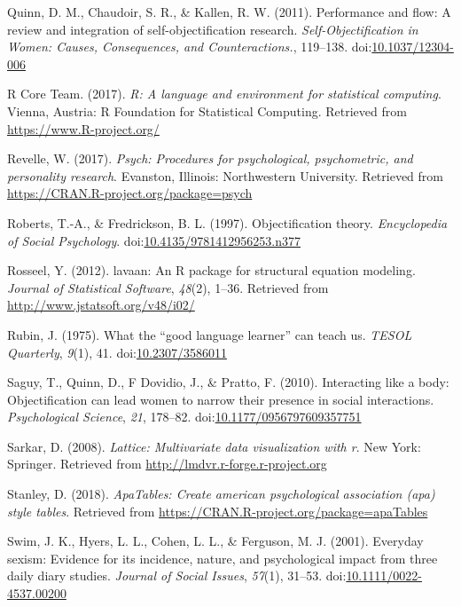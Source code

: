 \documentclass[man]{apa6}
\begin{document}
\hypertarget{ref-quinnetal}{}
Quinn, D. M., Chaudoir, S. R., \& Kallen, R. W. (2011). Performance and
flow: A review and integration of self-objectification research.
\emph{Self-Objectification in Women: Causes, Consequences, and
Counteractions.}, 119--138.
doi:\href{https://doi.org/10.1037/12304-006}{10.1037/12304-006}

\hypertarget{ref-R-base}{}
R Core Team. (2017). \emph{R: A language and environment for statistical
computing}. Vienna, Austria: R Foundation for Statistical Computing.
Retrieved from \url{https://www.R-project.org/}

\hypertarget{ref-R-psych}{}
Revelle, W. (2017). \emph{Psych: Procedures for psychological,
psychometric, and personality research}. Evanston, Illinois:
Northwestern University. Retrieved from
\url{https://CRAN.R-project.org/package=psych}

\hypertarget{ref-robertsfredrickson}{}
Roberts, T.-A., \& Fredrickson, B. L. (1997). Objectification theory.
\emph{Encyclopedia of Social Psychology}.
doi:\href{https://doi.org/10.4135/9781412956253.n377}{10.4135/9781412956253.n377}

\hypertarget{ref-R-lavaan}{}
Rosseel, Y. (2012). lavaan: An R package for structural equation
modeling. \emph{Journal of Statistical Software}, \emph{48}(2), 1--36.
Retrieved from \url{http://www.jstatsoft.org/v48/i02/}

\hypertarget{ref-rubin1975}{}
Rubin, J. (1975). What the ``good language learner'' can teach us.
\emph{TESOL Quarterly}, \emph{9}(1), 41.
doi:\href{https://doi.org/10.2307/3586011}{10.2307/3586011}

\hypertarget{ref-saguyetal2010}{}
Saguy, T., Quinn, D., F Dovidio, J., \& Pratto, F. (2010). Interacting
like a body: Objectification can lead women to narrow their presence in
social interactions. \emph{Psychological Science}, \emph{21}, 178--82.
doi:\href{https://doi.org/10.1177/0956797609357751}{10.1177/0956797609357751}

\hypertarget{ref-R-lattice}{}
Sarkar, D. (2008). \emph{Lattice: Multivariate data visualization with
r}. New York: Springer. Retrieved from
\url{http://lmdvr.r-forge.r-project.org}

\hypertarget{ref-R-apaTables}{}
Stanley, D. (2018). \emph{ApaTables: Create american psychological
association (apa) style tables}. Retrieved from
\url{https://CRAN.R-project.org/package=apaTables}

\hypertarget{ref-swimetal}{}
Swim, J. K., Hyers, L. L., Cohen, L. L., \& Ferguson, M. J. (2001).
Everyday sexism: Evidence for its incidence, nature, and psychological
impact from three daily diary studies. \emph{Journal of Social Issues},
\emph{57}(1), 31--53.
doi:\href{https://doi.org/10.1111/0022-4537.00200}{10.1111/0022-4537.00200}
\end{document}
